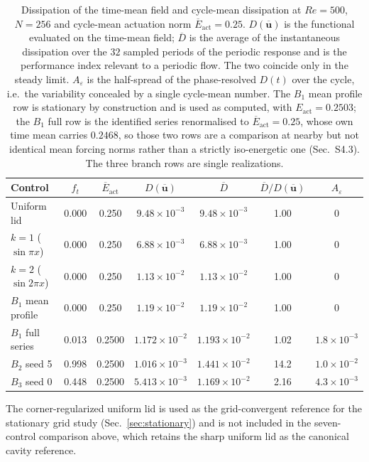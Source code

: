 \documentclass[11pt,a4paper]{article}
\newcommand{\Dbar}{\overline{D}}
\begin{document}
\begin{table}[t]
\centering
\caption{Dissipation of the time-mean field and cycle-mean dissipation at
$Re=500$, $N=256$ and cycle-mean actuation norm $\overline{E}_{\mathrm{act}}=0.25$.
$D(\overline{\mathbf{u}})$ is the functional evaluated on the time-mean field;
$\Dbar$ is the average of the instantaneous dissipation over the $32$ sampled
periods of the periodic response and is the performance index relevant to a
periodic flow. The two coincide only in the steady limit. $A_\varepsilon$ is the
half-spread of the phase-resolved $D(t)$ over the cycle, i.e.\ the variability
concealed by a single cycle-mean number. The $B_1$ mean profile row is stationary
by construction and is used as computed, with $E_{\mathrm{act}}=0.2503$; the $B_1$
full row is the identified series renormalised to $\overline{E}_{\mathrm{act}}=0.25$,
whose own time mean carries $0.2468$, so those two rows are a comparison at
nearby but not identical mean forcing norms rather than a strictly iso-energetic one
(Sec.~S4.3). The three branch
rows are single realizations.}
\label{tab:cycle}
\small
\begin{tabular}{lcccccc}
\toprule
Control & $f_t$ & $\overline{E}_{\mathrm{act}}$ & $D(\overline{\mathbf{u}})$ & $\Dbar$
& $\Dbar/D(\overline{\mathbf{u}})$ & $A_\varepsilon$\\
\midrule
Uniform lid & 0.000 & 0.250 & $9.48\times10^{-3}$ & $9.48\times10^{-3}$ & 1.00 & $0$\\
$k=1$ ($\sin\pi x$) & 0.000 & 0.250 & $6.88\times10^{-3}$ & $6.88\times10^{-3}$ & 1.00 & $0$\\
$k=2$ ($\sin 2\pi x$) & 0.000 & 0.250 & $1.13\times10^{-2}$ & $1.13\times10^{-2}$ & 1.00 & $0$\\
$B_1$ mean profile & 0.000 & 0.250 & $1.19\times10^{-2}$ & $1.19\times10^{-2}$ & 1.00 & $0$\\
$B_1$ full series & 0.013 & 0.2500 & $1.172\times10^{-2}$ & $1.193\times10^{-2}$ & 1.02 & $1.8\times10^{-3}$\\
$B_2$ seed 5 & 0.998 & 0.2500 & $1.016\times10^{-3}$ & $1.441\times10^{-2}$ & 14.2 & $1.0\times10^{-2}$\\
$B_3$ seed 0 & 0.448 & 0.2500 & $5.413\times10^{-3}$ & $1.169\times10^{-2}$ & 2.16 & $4.3\times10^{-3}$\\
\bottomrule
\end{tabular}
\end{table}

The corner-regularized uniform lid is used as the grid-convergent reference for the
stationary grid study (Sec.~\ref{sec:stationary}) and is not included
in the seven-control comparison above, which retains the sharp uniform lid as the
canonical cavity reference.
\end{document}
